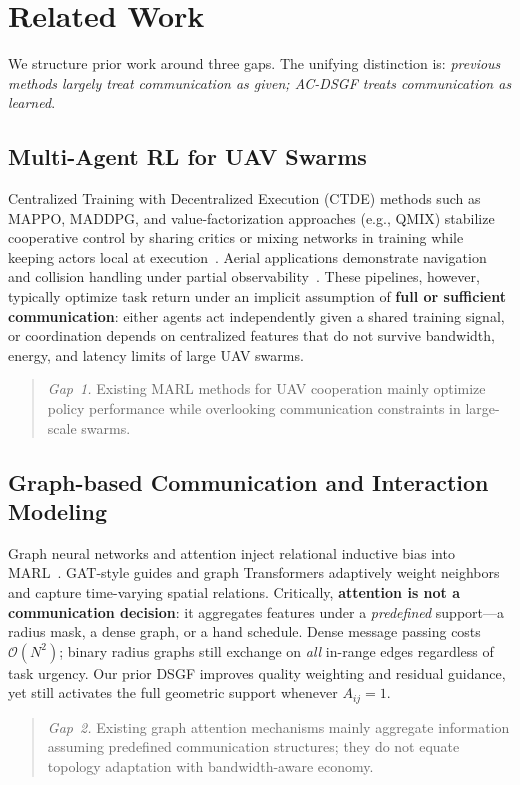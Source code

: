 
\section{Related Work}
\label{sec:related}

We structure prior work around three gaps.
The unifying distinction is:
\emph{previous methods largely treat communication as given;
AC-DSGF treats communication as learned}.

\subsection{Multi-Agent RL for UAV Swarms}
Centralized Training with Decentralized Execution (CTDE) methods such as MAPPO,
MADDPG, and value-factorization approaches (e.g., QMIX) stabilize cooperative
control by sharing critics or mixing networks in training while keeping
actors local at execution~\cite{yu2022mappo,lowe2017maddpg,rashid2018qmix}.
Aerial applications demonstrate navigation and collision handling under partial
observability~\cite{chung2018uav,bettini2022vmas}.
These pipelines, however, typically optimize task return under an implicit
assumption of \textbf{full or sufficient communication}: either agents act
independently given a shared training signal, or coordination depends on
centralized features that do not survive bandwidth, energy, and latency limits
of large UAV swarms.
\begin{quote}
\emph{Gap~1.}
Existing MARL methods for UAV cooperation mainly optimize policy performance
while overlooking communication constraints in large-scale swarms.
\end{quote}

\subsection{Graph-based Communication and Interaction Modeling}
Graph neural networks and attention inject relational inductive bias into
MARL~\cite{jiang2018graphcomm,iqbal2019actorattention,jiang2020graph,velickovic2018gat}.
GAT-style guides and graph Transformers adaptively weight neighbors and capture
time-varying spatial relations.
Critically, \textbf{attention is not a communication decision}: it aggregates
features under a \emph{predefined} support---a radius mask, a dense graph, or a
hand schedule.
Dense message passing costs $\mathcal{O}(N^{2})$; binary radius graphs still
exchange on \emph{all} in-range edges regardless of task urgency.
Our prior DSGF improves quality weighting and residual guidance, yet still
activates the full geometric support whenever $A_{ij}{=}1$.
\begin{quote}
\emph{Gap~2.}
Existing graph attention mechanisms mainly aggregate information assuming
predefined communication structures; they do not equate topology adaptation
with bandwidth-aware economy.
\end{quote}

